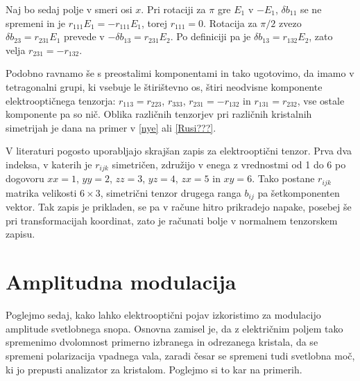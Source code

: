 \documentclass[11pt,fleqn]{book} %
\begin{document}
Naj bo sedaj polje v smeri osi $x$. Pri rotaciji za $\pi$ gre $E_{1}$
v $-E_{1}$, $\delta b_{11}$ se ne spremeni in je $r_{111}E_{1}=-r_{111}E_{1}$,
torej $r_{111}=0$. Rotacija za $\pi/2$ zvezo $\delta b_{23}=r_{231}E_{1}$
prevede v $-\delta b_{13}=r_{231}E_{2}$. Po definiciji pa je $\delta b_{13}=r_{132}E_{2}$,
zato velja $r_{231}=-r_{132}$.

Podobno ravnamo še s preostalimi komponentami in tako ugotovimo, da
imamo v tetragonalni grupi, ki vsebuje le štirištevno os, štiri neodvisne
komponente elektrooptičnega tenzorja: $r_{113}=r_{223}$, $r_{333}$,
$r_{231}=-r_{132}$ in $r_{131}=r_{232}$, vse ostale komponente pa
so nič. Oblika različnih tenzorjev pri različnih kristalnih simetrijah
je dana na primer v \ref{nye} ali \ref{Rusi???}.

V literaturi pogosto uporabljajo skrajšan zapis za elektrooptični
tenzor. Prva dva indeksa, v katerih je $r_{ijk}$ simetričen, združijo
v enega z vrednostmi od 1 do 6 po dogovoru $xx=1$, $yy=2$, $zz=3$,
$yz=4$, $zx=5$ in $xy=6$. Tako postane $r_{ijk}$ matrika velikosti
$6\times3$, simetrični tenzor drugega ranga $b_{ij}$ pa šetkomponenten
vektor. Tak zapis je prikladen, se pa v račune hitro prikradejo napake,
posebej še pri transformacijah koordinat, zato je računati bolje v
normalnem tenzorskem zapisu.


\section{Amplitudna modulacija}

Poglejmo sedaj, kako lahko elektrooptični pojav izkoristimo za modulacijo
amplitude svetlobnega snopa. Osnovna zamisel je, da z električnim
poljem tako spremenimo dvolomnost primerno izbranega in odrezanega
kristala, da se spremeni polarizacija vpadnega vala, zaradi česar
se spremeni tudi svetlobna moč, ki jo prepusti analizator za kristalom.
Poglejmo si to kar na primerih.
\end{document}
